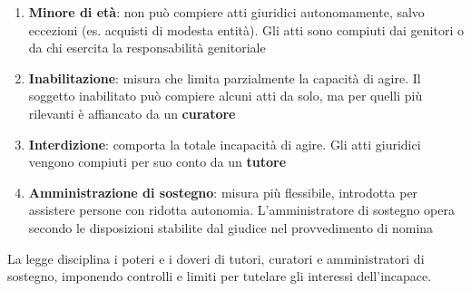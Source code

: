 \documentclass[8pt,oneside,a4paper]{article}
\begin{document}
	\begin{enumerate}
		\item \textbf{Minore di età}: non può compiere atti giuridici autonomamente, salvo eccezioni (es. acquisti di modesta entità). Gli atti sono compiuti dai genitori o da chi esercita la responsabilità genitoriale  
		\item \textbf{Inabilitazione}: misura che limita parzialmente la capacità di agire. Il soggetto inabilitato può compiere alcuni atti da solo, ma per quelli più rilevanti è affiancato da un \textbf{curatore}
		\item \textbf{Interdizione}: comporta la totale incapacità di agire. Gli atti giuridici vengono compiuti per suo conto da un \textbf{tutore} 
		\item \textbf{Amministrazione di sostegno}: misura più flessibile, introdotta per assistere persone con ridotta autonomia. L’amministratore di sostegno opera secondo le disposizioni stabilite dal giudice nel provvedimento di nomina
	\end{enumerate}
	La legge disciplina i poteri e i doveri di tutori, curatori e amministratori di sostegno, imponendo controlli e limiti per tutelare gli interessi dell’incapace.  
\end{document}
